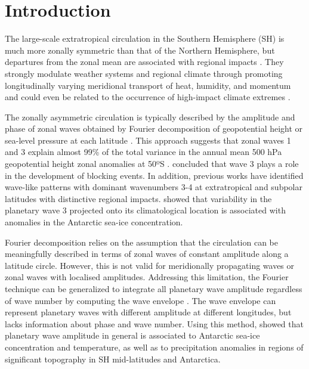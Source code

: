 \documentclass[pdflatex,lineno,sn-basic]{sn-jnl}
\theoremstyle{thmstyleone}%
\theoremstyle{thmstyletwo}%
\theoremstyle{thmstylethree}%
\begin{document}



\maketitle

\hypertarget{introduction}{%
\section{Introduction}\label{introduction}}

The large-scale extratropical circulation in the Southern Hemisphere (SH) is much more zonally symmetric than that of the Northern Hemisphere, but departures from the zonal mean are associated with regional impacts \citep[e.g.][]{hoskins2005}.
They strongly modulate weather systems and regional climate through promoting longitudinally varying meridional transport of heat, humidity, and momentum \citep{trenberth1980a, raphael2007} and could even be related to the occurrence of high-impact climate extremes \citep{pezza2012}.

The zonally asymmetric circulation is typically described by the amplitude and phase of zonal waves obtained by Fourier decomposition of geopotential height or sea-level pressure at each latitude \citep[e.g.][]{vanloon1972, trenberth1980a, turner2017}.
This approach suggests that zonal waves 1 and 3 explain almost 99\% of the total variance in the annual mean 500 hPa geopotential height zonal anomalies at 50ºS \citep{vanloon1972}.
\citet{trenberth1985} concluded that wave 3 plays a role in the development of blocking events.
In addition, previous works have identified wave-like patterns with dominant wavenumbers 3-4 at extratropical and subpolar latitudes with distinctive regional impacts.
\citet{raphael2007} showed that variability in the planetary wave 3 projected onto its climatological location is associated with anomalies in the Antarctic sea-ice concentration.

Fourier decomposition relies on the assumption that the circulation can be meaningfully described in terms of zonal waves of constant amplitude along a latitude circle.
However, this is not valid for meridionally propagating waves or zonal waves with localised amplitudes.
Addressing this limitation, the Fourier technique can be generalized to integrate all planetary wave amplitude regardless of wave number by computing the wave envelope \citep{irving2015}.
The wave envelope can represent planetary waves with different amplitude at different longitudes, but lacks information about phase and wave number.
Using this method, \citet{irving2015} showed that planetary wave amplitude in general is associated to Antarctic sea-ice concentration and temperature, as well as to precipitation anomalies in regions of significant topography in SH mid-latitudes and Antarctica.
\end{document}

